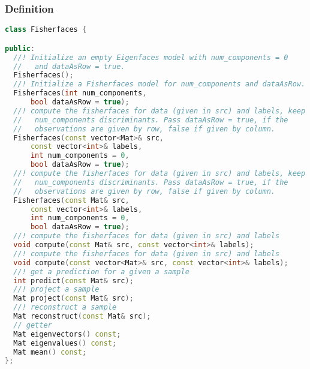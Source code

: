 \subsubsection{Definition}
\begin{lstlisting}[language=c++]
class Fisherfaces {

public:
  //! Initialize an empty Eigenfaces model with num_components = 0
  //   and dataAsRow = true.
  Fisherfaces();
  //! Initialize a Fisherfaces model for num_components and dataAsRow.
  Fisherfaces(int num_components, 
      bool dataAsRow = true);
  //! compute the fisherfaces for data (given in src) and labels, keep 
  //   num_components discriminants. Pass dataAsRow = true, if the 
  //   observations are given by row, false if given by column.
  Fisherfaces(const vector<Mat>& src, 
      const vector<int>& labels,
      int num_components = 0,
      bool dataAsRow = true);
  //! compute the fisherfaces for data (given in src) and labels, keep 
  //   num_components discriminants. Pass dataAsRow = true, if the 
  //   observations are given by row, false if given by column.
  Fisherfaces(const Mat& src,
      const vector<int>& labels,
      int num_components = 0,
      bool dataAsRow = true);
  //! compute the fisherfaces for data (given in src) and labels 
  void compute(const Mat& src, const vector<int>& labels);
  //! compute the fisherfaces for data (given in src) and labels 
  void compute(const vector<Mat>& src, const vector<int>& labels);
  //! get a prediction for a given a sample
  int predict(const Mat& src);
  //! project a sample
  Mat project(const Mat& src);
  //! reconstruct a sample
  Mat reconstruct(const Mat& src);
  // getter
  Mat eigenvectors() const;
  Mat eigenvalues() const;
  Mat mean() const;
};
\end{lstlisting}

